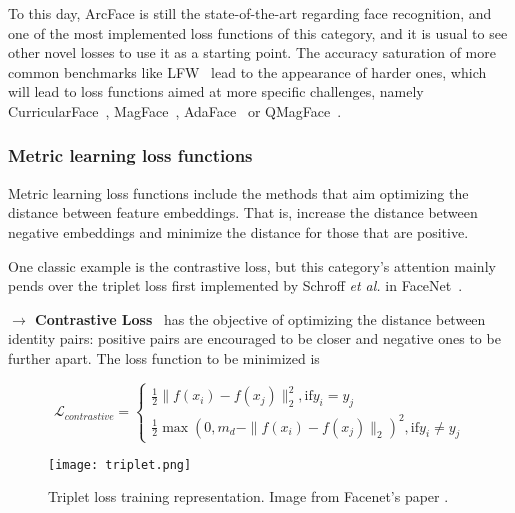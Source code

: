 \documentclass[class=report, crop=false, a4paper, 12pt]{standalone}
\begin{document}
\par To this day, ArcFace is still the state-of-the-art regarding face recognition, and one of the most implemented loss functions of this category, and it is usual to see other novel losses to use it as a starting point. The accuracy saturation of more common benchmarks like LFW~\autocite{huangLabeledFacesWild} lead to the appearance of harder ones, which will lead to loss functions aimed at more specific challenges, namely CurricularFace~\autocite{huangCurricularFaceAdaptiveCurriculum2020}, MagFace~\autocite{mengMagFaceUniversalRepresentation2021}, AdaFace~\autocite{kimAdaFaceQualityAdaptive2022} or QMagFace~\autocite{terhorstQMagFaceSimpleAccurate2023}.

\subsubsection{Metric learning loss functions}
Metric learning loss functions include the methods that aim optimizing the distance between feature embeddings. That is, increase the distance between negative embeddings and minimize the distance for those that are positive.
\par One classic example is the contrastive loss, but this category's attention mainly pends over the triplet loss first implemented by Schroff \textit{et al.} in FaceNet~\autocite{schroffFaceNetUnifiedEmbedding2015}. 

\vspace{0.7\baselineskip}
\noindent\textbf{$\rightarrow$ Contrastive Loss}~\autocite{duElementsEndtoendDeep2022} has the objective of optimizing the distance between identity pairs: positive pairs are encouraged to be closer and negative ones to be further apart. The loss function to be minimized is

\begin{equation}
    \mathcal{L}_{contrastive} = 
    \begin{cases}
      \frac{1}{2}\|f(x_i)-f(x_j)\|^{2}_{2}, \text{if} y_i=y_j\\
      \frac{1}{2}\max{(0, m_d-\|f(x_i)-f(x_j)\|_2)^2}, \text{if} y_i\neq y_j
    \end{cases}
\end{equation}

\begin{figure}[!h]
    \centering
    \texttt{[image: triplet.png]}
    \caption[Triplet loss training representation.]{Triplet loss training representation. Image from Facenet's paper \autocite{schroffFaceNetUnifiedEmbedding2015}.}
    \label{fig:triplet}
\end{figure}
\end{document}

